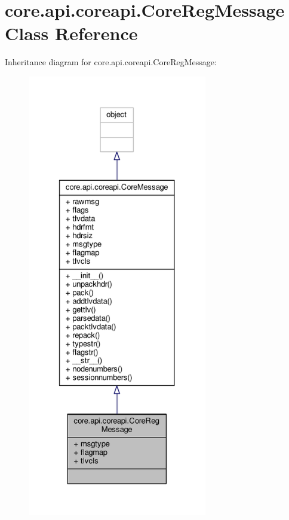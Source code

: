 \hypertarget{classcore_1_1api_1_1coreapi_1_1_core_reg_message}{\section{core.\+api.\+coreapi.\+Core\+Reg\+Message Class Reference}
\label{classcore_1_1api_1_1coreapi_1_1_core_reg_message}
}


Inheritance diagram for core.\+api.\+coreapi.\+Core\+Reg\+Message\+:
\nopagebreak
\begin{figure}[H]
\begin{center}
\leavevmode
\includegraphics[height=550pt]{classcore_1_1api_1_1coreapi_1_1_core_reg_message__inherit__graph}
\end{center}
\end{figure}


